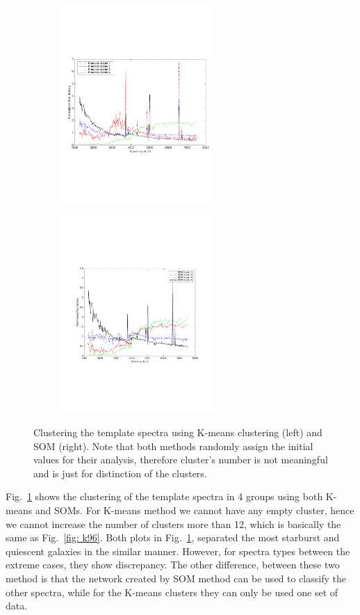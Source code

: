\begin{figure}
                \begin{subfigure}[b]{0.49\textwidth}
                    \centering
                  \includegraphics[width=.99\textwidth, height= 7.5cm]{k_means_images/classified_group_in_4cluster.pdf}
                \end{subfigure}
                \hfill
                \begin{subfigure}[b]{0.49\textwidth}
                    \centering \includegraphics[width=.99\textwidth, height= 7.5cm]{k_means_images/classified_group_in_4cluster_som.pdf}
                \end{subfigure}
                \caption{Clustering the  template spectra using K-means clustering (left) and SOM (right). Note that both methods randomly assign the initial values for their analysis, therefore cluster's number is not meaningful and is just for distinction of the clusters.}
                 \label{fig: som_k_means_4}
\end{figure}
Fig.~\ref{fig: som_k_means_4} shows the clustering of the template spectra in 4 groups using both K-means and SOMs.
For K-means method we cannot have any empty cluster, hence we cannot increase the number of clusters more than 12, which is basically the same as Fig.~\ref{fig: k96}.
Both plots in Fig.~\ref{fig: som_k_means_4}, separated the most starburst and quiescent galaxies in the similar manner.
However, for spectra types between the extreme cases, they show discrepancy. 
The other difference, between these two method is that the network created by SOM method can be used to classify the other spectra, while for the K-means clusters they can only be used one set of data.



